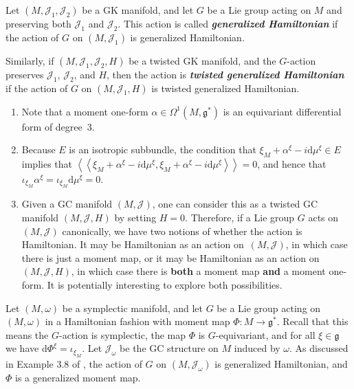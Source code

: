 \documentclass[11pt]{article}
\numberwithin{equation}{section}
\newcommand{\deff}[1]{\textbf{\emph{#1}}}
\newcommand{\func}[3]{#1 \colon #2 \to #3}
\newcommand{\iiprod}[2]{\left\langle \! \left\langle {#1} , {#2} \right\rangle \! \right\rangle}
\newcommand{\litlet}{\renewcommand{\labelenumi}{(\alph{enumi})}}
\begin{document}
\begin{Definition}
Let $(M,\mathcal{J}_1,\mathcal{J}_2)$ be a GK manifold, and let $G$ be a Lie group acting on $M$ and preserving both $\mathcal{J}_1$ and $\mathcal{J}_2$.  This action is called \deff{generalized Hamiltonian} if the action of $G$ on $(M,\mathcal{J}_1)$ is generalized Hamiltonian.

Similarly, if $(M,\mathcal{J}_1,\mathcal{J}_2,H)$ be a twisted GK manifold, and the $G$-action preserves $\mathcal{J}_1$, $\mathcal{J}_2$, and $H$, then the action is \deff{twisted generalized Hamiltonian} if the action of $G$ on $(M,\mathcal{J}_1,H)$ is twisted generalized Hamiltonian.
\end{Definition}


\begin{Remark} \label{rem1} \qquad
\begin{enumerate} \itemsep=0pt\litlet
  \item Note that a moment one-form $\alpha \in \Omega^1(M,\mathfrak{g}^*)$ is an equivariant dif\/ferential form of degree~$3$.

  \item Because $E$ is an isotropic subbundle, the condition that $\xi_M + \alpha^{\xi} - i \mathrm{d} \mu^{\xi} \in E$ implies that $\iiprod{\xi_M + \alpha^{\xi} - i \mathrm{d} \mu^{\xi}}{\xi_M + \alpha^{\xi} - i \mathrm{d} \mu^{\xi}}=0$, and hence that $\iota_{\xi_M} \alpha^{\xi} = \iota_{\xi_M} \mathrm{d} \mu^{\xi} = 0$.

  \item Given a GC manifold $(M,\mathcal{J})$, one can consider this as a twisted GC manifold $(M,\mathcal{J},H)$ by setting $H=0$.  Therefore, if a Lie group $G$ acts on $(M,\mathcal{J})$ canonically, we have two notions of whether the action is Hamiltonian.  It may be Hamiltonian as an action on~$(M,\mathcal{J})$, in which case there is just a moment map, or it may be Hamiltonian as an action on $(M,\mathcal{J},H)$, in which case there is {\bf both} a moment map {\bf and} a moment one-form.
  It is potentially interesting to explore both possibilities.
\end{enumerate}
\end{Remark}


\begin{Example} \label{example3}
Let $(M,\omega)$ be a symplectic manifold, and let $G$ be a Lie group acting on $(M,\omega)$ in a Hamiltonian fashion with moment map $\func{\Phi}{M}{\mathfrak{g}^*}$.  Recall that this means the $G$-action is symplectic, the map $\Phi$ is $G$-equivariant, and for all $\xi \in \mathfrak{g}$ we have $\mathrm{d} \Phi^{\xi} = \iota_{\xi_M}$.
Let $\mathcal{J}_{\omega}$ be the GC structure on $M$ induced by $\omega$.  As discussed in Example 3.8 of \cite{lintolman}, the action of $G$ on $(M,\mathcal{J}_{\omega})$ is generalized Hamiltonian, and $\Phi$ is a generalized moment map.
\end{Example}
\end{document}
